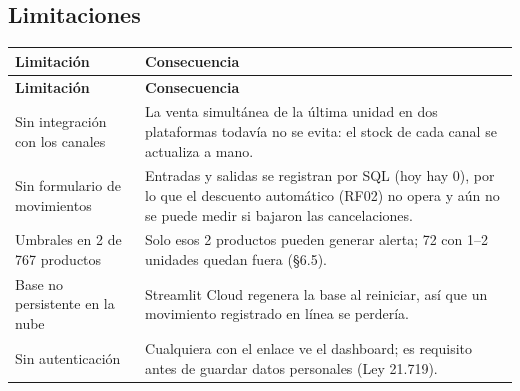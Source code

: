 \documentclass[11pt,letterpaper]{article}
\renewcommand{\_}{\oldus\allowbreak}
\begin{document}
\subsection{Limitaciones}
\begin{small}
\begin{longtable}{>{\raggedright\arraybackslash}p{4.2cm} >{\raggedright\arraybackslash}p{10.9cm}}
\toprule
\textbf{Limitación} & \textbf{Consecuencia} \\
\midrule
\endfirsthead
\toprule
\textbf{Limitación} & \textbf{Consecuencia} \\
\midrule
\endhead
\bottomrule
\endfoot
Sin integración con los canales & La venta simultánea de la última unidad en dos plataformas todavía no se evita: el stock de cada canal se actualiza a mano. \\
Sin formulario de movimientos & Entradas y salidas se registran por SQL (hoy hay 0), por lo que el descuento automático (RF02) no opera y aún no se puede medir si bajaron las cancelaciones. \\
Umbrales en 2 de 767 productos & Solo esos 2 productos pueden generar alerta; 72 con 1–2 unidades quedan fuera (§6.5). \\
Base no persistente en la nube & Streamlit Cloud regenera la base al reiniciar, así que un movimiento registrado en línea se perdería. \\
Sin autenticación & Cualquiera con el enlace ve el dashboard; es requisito antes de guardar datos personales (Ley 21.719). \\
\end{longtable}
\end{small}
\end{document}
